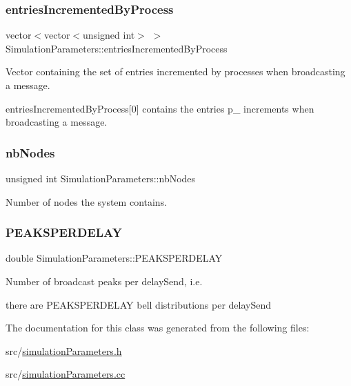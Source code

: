 \subsubsection{\texorpdfstring{entries\+Incremented\+By\+Process}{entriesIncrementedByProcess}}
{\footnotesize\ttfamily vector$<$vector$<$unsigned int$>$ $>$ Simulation\+Parameters\+::entries\+Incremented\+By\+Process}



Vector containing the set of entries incremented by processes when broadcasting a message. 

entries\+Incremented\+By\+Process\mbox{[}0\mbox{]} contains the entries p\+\_ increments when broadcasting a message. \mbox{\label{class_simulation_parameters_a96391a1b611de11ca4d0babba7117872}} 
\subsubsection{\texorpdfstring{nb\+Nodes}{nbNodes}}
{\footnotesize\ttfamily unsigned int Simulation\+Parameters\+::nb\+Nodes}



Number of nodes the system contains. 

\mbox{\label{class_simulation_parameters_a57cd536ac7c057b5c2d5c85faa4d846d}} 
\subsubsection{\texorpdfstring{P\+E\+A\+K\+S\+P\+E\+R\+D\+E\+L\+AY}{PEAKSPERDELAY}}
{\footnotesize\ttfamily double Simulation\+Parameters\+::\+P\+E\+A\+K\+S\+P\+E\+R\+D\+E\+L\+AY}



Number of broadcast peaks per delay\+Send, i.\+e. 

there are P\+E\+A\+K\+S\+P\+E\+R\+D\+E\+L\+AY bell distributions per delay\+Send 

The documentation for this class was generated from the following files\+:\begin{DoxyCompactItemize}
\item 
src/\hyperlink{simulation_parameters_8h}{simulation\+Parameters.\+h}\item 
src/\hyperlink{simulation_parameters_8cc}{simulation\+Parameters.\+cc}\end{DoxyCompactItemize}
